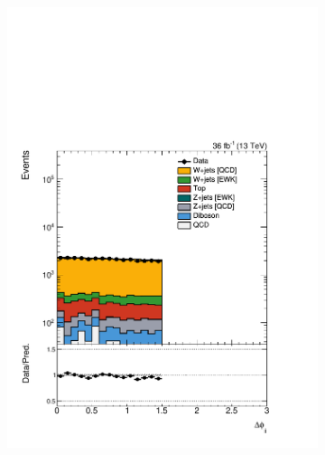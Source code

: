 \begin{figure}[]
\begin{center}
\begin{subfigure}[t]{0.24\textwidth}
            \includegraphics[width=\textwidth]{figures/vbf/prefit/singlemuon_jot12DPhi_logy.pdf}
        \end{subfigure}
        \begin{subfigure}[t]{0.24\textwidth}

\end{subfigure}
\end{center}
\end{figure}
